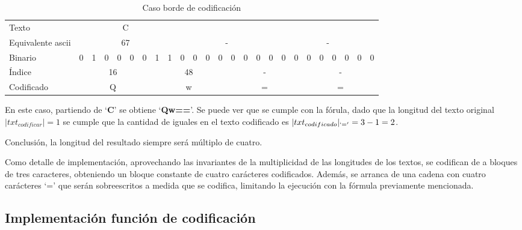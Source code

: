 \documentclass[titlepage,a4paper]{article}
\begin{document}
\begin{table}[H]
\centering
\setlength{\tabcolsep}{4pt}
\begin{tabular}{l|cccccc||cc|cccc||cccc|cc||cccccc}
Texto             & \multicolumn{8}{c|}{C}        & \multicolumn{8}{c|}{}        & \multicolumn{8}{c}{}        \\
Equivalente ascii & \multicolumn{8}{c|}{67}       & \multicolumn{8}{c|}{-}      & \multicolumn{8}{c}{-}      \\
 Binario           & 0 & 1 & 0 & 0 & 0 & 0 & 1 & 1 & \cellcolor[HTML]{EAECF0}0 & \cellcolor[HTML]{EAECF0}0 & \cellcolor[HTML]{EAECF0}0 & \cellcolor[HTML]{EAECF0}0 & \cellcolor[HTML]{EAECF0}0 & \cellcolor[HTML]{EAECF0}0 & \cellcolor[HTML]{EAECF0}0 & \cellcolor[HTML]{EAECF0}0 & \cellcolor[HTML]{EAECF0}0 & \cellcolor[HTML]{EAECF0}0 & \cellcolor[HTML]{EAECF0}0 & \cellcolor[HTML]{EAECF0}0 & \cellcolor[HTML]{EAECF0}0 & \cellcolor[HTML]{EAECF0}0 & \cellcolor[HTML]{EAECF0}0 & \cellcolor[HTML]{EAECF0}0 \\
Índice & \multicolumn{6}{c||}{16} & \multicolumn{6}{c||}{48} & \multicolumn{6}{c||}{-} & \multicolumn{6}{c}{-} \\
Codificado & \multicolumn{6}{c||}{Q} & \multicolumn{6}{c||}{w} & \multicolumn{6}{c||}{=} & \multicolumn{6}{c}{=}
\end{tabular}
\caption{Caso borde de codificación}
\label{table:caso_borde}
\centering
\end{table}

En este caso, partiendo de `\textbf{C}' se obtiene `\textbf{Qw==}'. Se puede ver que se cumple con la fórula, dado que la longitud del texto original $|txt_{codificar}| = 1$ se cumple que la cantidad de iguales en el texto codificado es $|txt_{codificado}|_{`='} = 3 - 1 = 2$.

Conclusión, la longitud del resultado siempre será múltiplo de cuatro.

Como detalle de implementación, aprovechando las invariantes de la multiplicidad de las longitudes de los textos, se codifican de a bloques de tres caracteres, obteniendo un bloque constante de cuatro carácteres codificados. Además, se arranca de una cadena con cuatro carácteres `=' que serán sobreescritos a medida que se codifica, limitando la ejecución con la fórmula previamente mencionada.



\subsection{Implementación función de codificación}
\end{document}
